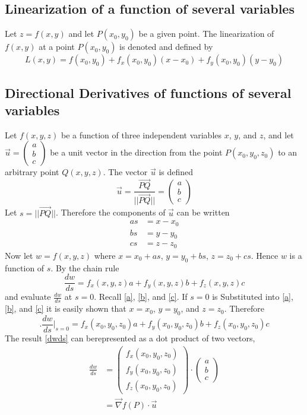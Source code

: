 \documentclass[14pt]{article}
\begin{document}
    \subsection{Linearization of a function of several variables}
    Let  $z=f(x,y)$ and let $P(x_0, y_0)$ be a given point. The
    linearization of $f(x,y)$ at a point $P(x_0, y_0)$ is denoted and
    defined by
    $$L(x,y)=f(x_0,y_0)+f_x(x_0, y_0)(x-x_0)+f_y(x_0, y_0)(y-y_0)$$
    \subsection{Directional Derivatives of functions of several variables}
    Let $f(x,y,z)$ be a function of three independent variables $x$,
    $y$, and $z$, and let $\vec u=\begin{pmatrix}a\\b\\c\end{pmatrix}$
    be a unit vector in the direction from the point $P(x_0, y_0, z_0)$
    to an arbitrary point $Q(x,y,z)$. The vector $\vec u$ is defined
    $$\vec u=\frac{\vec{PQ}}{||\vec
    {PQ}||}=\begin{pmatrix}a\\b\\c\end{pmatrix}$$ Let $s=||\vec{PQ}||$.
    Therefore the components of $\vec u$ can be written
    \begin{align}
        as&=x-x_0\label{a}\\
        bs&=y-y_0\label{b}\\
        cs&=z-z_0\label{c}
    \end{align}
    Now let $w=f(x,y,z)$ where $x=x_0+as$, $y=y_0+bs$, $z=z_0+cs$. Hence
    $w$ is a function of $s$. By the chain rule
    $$\frac{dw}{ds}=f_x(x,y,z)a+f_y(x,y,z)b+f_z(x,y,z)c$$ and evaluate
    $\frac{dw}{ds}$ at $s=0$. Recall \eqref{a}, \eqref{b}, and
    \eqref{c}. If $s=0$ is Substituted into \eqref{a}, \eqref{b}, and
    \eqref{c} it is easily shown that $x=x_0$, $y=y_0$, and $z=z_0$.
    Therefore
    \begin{equation}\label{dwds}
        \bigg. \frac{dw}{ds}\bigg|_{s=0}=f_x(x_0,y_0,z_0)a+f_y(x_0,y_0,z_0)b+f_z(x_0,y_0,z_0)c
    \end{equation}
    The result \eqref{dwds} can berepresented as a dot product of two
    vectors,
    \begin{align*}
        \frac{dw}{ds}&=\begin{pmatrix}f_x(x_0, y_0, z_0)\\f_y(x_0, y_0, z_0)\\f_z(x_0, y_0, z_0)\end{pmatrix}\cdot\begin{pmatrix}a\\b\\c\end{pmatrix}\\
        &=\vec\nabla f(P)\cdot \vec u
    \end{align*}
\end{document}

